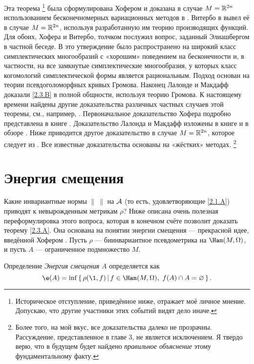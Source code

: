 Эта теорема%
\footnote{Историческое отступление, приведённое ниже, отражает моё личное мнение.
Допускаю, что другие участники этих событий видят дело иначе.}
была сформулирована Хофером и доказана в случае $M = \mathbb{R}^{2n}$
использованием бесконечномерных вариационных методов в \cite{H1}.
Витербо в \cite{V1} вывел её в случае $M = \mathbb{R}^{2n}$, используя разработанную им теорию производящих функций.
Для обоих, Хофера и Витербо, толчком послужил вопрос, заданный Элиашбергом в частной беседе.
В \cite{P1} это утверждение было распространено на широкий класс симплектических многообразий с «хорошим» поведением на бесконечности и, в частности, на все замкнутые симплектические многообразия, у которых класс когомологий симплектической формы является рациональным.
Подход \cite{P1} основан на теории псевдоголоморфных кривых Громова.
Наконец \cite{LM1} Лалонде и Макдафф доказали \ref{2.3.B} в полной общности, используя теорию Громова.
К настоящему времени найдены другие доказательства различных частных случаев этой теоремы, см., например, \cite{Ch,O3,Sch3}.
Первоначальное доказательство Хофера подробно представлена в книге
\cite{HZ}.
Доказательство Лалонда и Макдафф изложены в книге \cite{MS} и в обзоре \cite{L}.
Ниже приводится другое доказательство в случае $M = \mathbb{R}^{2n}$, которое следует из \cite{P1}.
Все известные доказательства основаны на «жёстких» методах.%
\footnote{Более того, на мой вкус, все доказательства далеко не прозрачны.
Рассуждение, представленное в главе 3, не является исключением.
Я твердо верю, что в будущем будет найдено {}\emph{правильное объяснение} этому фундаментальному факту.}

\section{Энергия смещения}\label{sec:2.4}

Какие инвариантные нормы $\|\ \|$ на $\mathcal{A}$ (то есть, удовлетворяющие \ref{2.1.A}) приводят к невырожденным метрикам $\rho$?
Ниже описана очень полезная переформулировка этого вопроса, которая в конечном счёте позволит доказать теорему \ref{2.3.A}.
Она основана на понятии энергии смещения — прекрасной идее, введённой Хофером \cite{H1}.
Пусть $\rho$ — биинвариантное псевдометрика на $\Ham (M, \Omega)$, и пусть $A$ — ограниченное подмножество $M$.

\begin{ex*}{Определение}
\emph{Энергия смещения} $A$ определяется как 
\[\e(A) = \inf \set{\rho (\1, f)}{f \in \Ham (M, \Omega),\  f (A) \cap A = \emptyset}.\]
\end{ex*}

